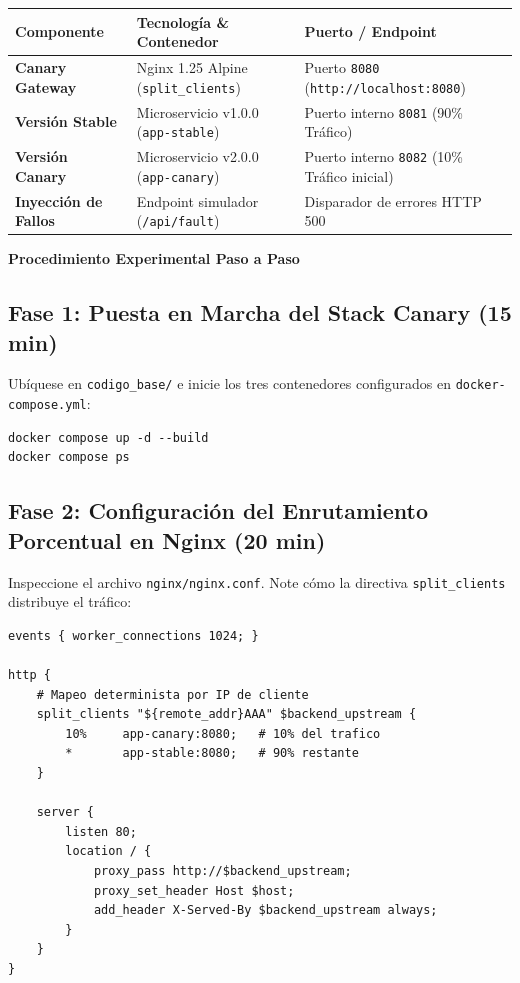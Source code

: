 \documentclass[10pt,letterpaper]{article}
\newcommand{\sectionBadge}[1]{%
  \refstepcounter{section}%
  \vspace{0.16cm}%
  \noindent%
  \colorbox{icesiBlue}{\color{white}\rule[-0.08cm]{0pt}{0.42cm}\hspace{0.16cm}\textbf{\normalsize \thesection}\hspace{0.16cm}}%
  \hspace{0.18cm}%
  {\fontsize{9.5}{12}\selectfont\textbf{\color{icesiDark}#1}}\\[-0.10cm]%
  \noindent{\color{icesiDark}\rule{\textwidth}{0.8pt}}\vspace{0.06cm}%
}
\begin{document}
\vspace{0.08cm}
\noindent
\small
\begin{tabularx}{\textwidth}{|L{2.8cm}|X|L{3.5cm}|}
\hline
{}
\textbf{Componente} & \textbf{Tecnología \& Contenedor} & \textbf{Puerto / Endpoint} \\ \hline
\textbf{Canary Gateway} & Nginx 1.25 Alpine (\texttt{split\_clients}) & Puerto \texttt{8080} (\texttt{http://localhost:8080}) \\ \hline
\textbf{Versión Stable} & Microservicio v1.0.0 (\texttt{app-stable}) & Puerto interno \texttt{8081} (90\% Tráfico) \\ \hline
\textbf{Versión Canary} & Microservicio v2.0.0 (\texttt{app-canary}) & Puerto interno \texttt{8082} (10\% Tráfico inicial) \\ \hline
\textbf{Inyección de Fallos} & Endpoint simulador (\texttt{/api/fault}) & Disparador de errores HTTP 500 \\ \hline
\end{tabularx}

\newpage

\sectionBadge{Procedimiento Experimental Paso a Paso}

\subsection{Fase 1: Puesta en Marcha del Stack Canary (15 min)}
Ubíquese en \texttt{codigo\_base/} e inicie los tres contenedores configurados en \texttt{docker-compose.yml}:
\begin{lstlisting}[style=bashstyle]
docker compose up -d --build
docker compose ps
\end{lstlisting}

\subsection{Fase 2: Configuración del Enrutamiento Porcentual en Nginx (20 min)}
Inspeccione el archivo \texttt{nginx/nginx.conf}. Note cómo la directiva \texttt{split\_clients} distribuye el tráfico:
\begin{lstlisting}[style=codeStyle]
events { worker_connections 1024; }

http {
    # Mapeo determinista por IP de cliente
    split_clients "${remote_addr}AAA" $backend_upstream {
        10%     app-canary:8080;   # 10% del trafico
        *       app-stable:8080;   # 90% restante
    }

    server {
        listen 80;
        location / {
            proxy_pass http://$backend_upstream;
            proxy_set_header Host $host;
            add_header X-Served-By $backend_upstream always;
        }
    }
}
\end{lstlisting}
\end{document}
